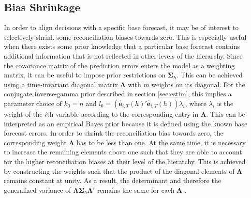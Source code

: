 \documentclass[a4paper,fleqn,11pt]{article}
\begin{document}
\subsection{Bias Shrinkage}\label{sec:weighting}
In order to align decisions with a specific base forecast, it may be of interest to selectively shrink some reconciliation biases towards zero. This is especially useful when there exists some prior knowledge that a particular base forecast contains additional information that is not reflected in other levels of the hierarchy. Since the covariance matrix of the prediction errors enters the model as a weighting matrix, it can be useful to impose prior restrictions on $\boldsymbol{\Sigma}_h$. This can be achieved using a time-invariant diagonal matrix $\boldsymbol{\Lambda}$ with $m$ weights on its diagonal. For the conjugate inverse-gamma prior described in section \ref{sec:estim}, this implies a parameter choice of $k_0 = n $ and $l_0 = (\mathbf{\hat{e}}_{i,T}(h)'\mathbf{\hat{e}}_{i,T}(h)) \lambda_i$, where $\lambda_i$ is the weight of the $i$th variable according to the corresponding entry in $\boldsymbol{\Lambda}$.
This can be interpreted as an empirical Bayes prior because it is defined using the known base forecast errors. In order to shrink the reconciliation bias towards zero, the corresponding weight $\boldsymbol{\Lambda}$ has to be less than one. At the same time, it is necessary to increase the remaining elements above one such that they are able to account for the higher reconciliation biases at their level of the hierarchy. This is achieved by constructing the weights such that the product of the diagonal elements of $\boldsymbol{\Lambda}$ remains constant at unity. As a result, the determinant and therefore the generalized variance of $\boldsymbol{\Lambda} \boldsymbol{\Sigma}_h \boldsymbol{\Lambda}'$ remains the same for each $\boldsymbol{\Lambda}$ \citep{Mustonen1997}.
\end{document}
